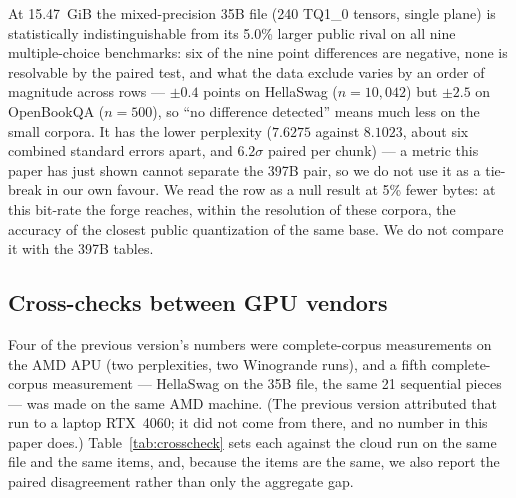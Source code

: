 \documentclass[10pt]{article} %
\begin{document}
At 15.47~GiB the mixed-precision 35B file (240 TQ1\_0 tensors, single plane) is
statistically indistinguishable from its 5.0\% larger public rival on all
nine multiple-choice benchmarks: six of the nine point differences are
negative, none is resolvable by the paired test, and what the data exclude
varies by an order of magnitude across rows --- $\pm 0.4$ points on HellaSwag
($n = 10{,}042$) but $\pm 2.5$ on OpenBookQA ($n = 500$), so ``no difference
detected'' means much less on the small corpora. It has the lower perplexity
($7.6275$ against $8.1023$, about six combined standard errors apart, and
$6.2\sigma$ paired per chunk) --- a metric this paper has just shown cannot
separate the 397B pair, so we do not use it as a tie-break in our own favour.
We read the row as a null result at 5\% fewer bytes: at this bit-rate the
forge reaches, within the resolution of these corpora, the accuracy of the
closest public quantization of the same base. We do not compare it with the
397B tables.

\subsection{Cross-checks between GPU vendors}
\label{sec:crosscheck}

Four of the previous version's numbers were complete-corpus measurements on
the AMD APU (two perplexities, two Winogrande runs), and a fifth complete-corpus
measurement --- HellaSwag on the 35B file, the same 21 sequential pieces --- was
made on the same AMD machine. (The previous version attributed that run to a
laptop RTX~4060; it did not come from there, and no number in this paper does.)
Table~\ref{tab:crosscheck} sets each against the cloud
run on the same file and the same items, and, because the items are the same,
we also report the paired disagreement rather than only the aggregate gap.
\end{document}
